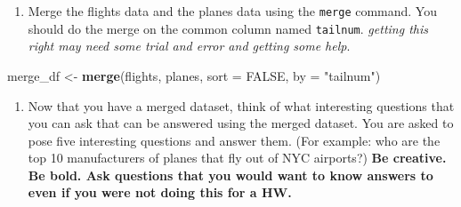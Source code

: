 \documentclass[
]{article}
\newenvironment{Shaded}{\begin{snugshade}}{\end{snugshade}}
\newcommand{\DataTypeTok}[1]{\textcolor[rgb]{0.13,0.29,0.53}{#1}}
\newcommand{\KeywordTok}[1]{\textcolor[rgb]{0.13,0.29,0.53}{\textbf{#1}}}
\newcommand{\NormalTok}[1]{#1}
\newcommand{\OperatorTok}[1]{\textcolor[rgb]{0.81,0.36,0.00}{\textbf{#1}}}
\newcommand{\OtherTok}[1]{\textcolor[rgb]{0.56,0.35,0.01}{#1}}
\newcommand{\StringTok}[1]{\textcolor[rgb]{0.31,0.60,0.02}{#1}}
\providecommand{\tightlist}{%
  \setlength{\itemsep}{0pt}\setlength{\parskip}{0pt}}
\begin{document}
\begin{Shaded}
\end{Shaded}

\begin{enumerate}
\def\labelenumi{\alph{enumi})}
\setcounter{enumi}{1}
\tightlist
\item
  Merge the flights data and the planes data using the \texttt{merge}
  command. You should do the merge on the common column named
  \texttt{tailnum}. \emph{getting this right may need some trial and
  error and getting some help}.
\end{enumerate}

\begin{Shaded}
\begin{Highlighting}[]
\NormalTok{merge_df <-}\StringTok{ }\KeywordTok{merge}\NormalTok{(flights, planes, }\DataTypeTok{sort =} \OtherTok{FALSE}\NormalTok{, }\DataTypeTok{by =} \StringTok{"tailnum"}\NormalTok{)}
\end{Highlighting}
\end{Shaded}

\begin{enumerate}
\def\labelenumi{\alph{enumi})}
\setcounter{enumi}{2}
\tightlist
\item
  Now that you have a merged dataset, think of what interesting
  questions that you can ask that can be answered using the merged
  dataset. You are asked to pose five interesting questions and answer
  them. (For example: who are the top 10 manufacturers of planes that
  fly out of NYC airports?) \textbf{Be creative. Be bold. Ask questions
  that you would want to know answers to even if you were not doing this
  for a HW. }
\end{enumerate}
\end{document}
